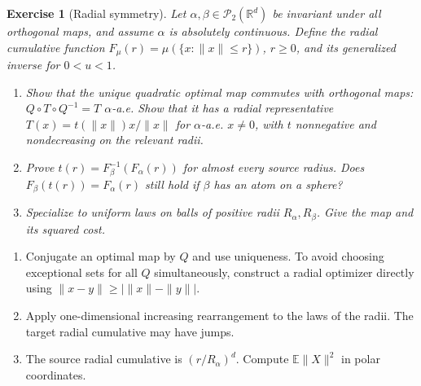 \documentclass[11pt,a4paper]{article}
\theoremstyle{exostyle}
\newtheorem{exercise}{Exercise}
\newcommand{\R}{\mathbb{R}}
\begin{document}
\begin{exercise}[Radial symmetry]\label{ex:radial}
Let $\alpha,\beta\in\mathcal P_2(\R^d)$ be invariant under all orthogonal maps, and assume $\alpha$ is absolutely continuous. Define the radial cumulative function
$F_\mu(r)=\mu(\{x:\|x\|\le r\})$, $r\ge0$, and its generalized inverse for $0<u<1$.
\begin{enumerate}[label=(\roman*)]
\item Show that the unique quadratic optimal map commutes with orthogonal maps: $Q\circ T\circ Q^{-1}=T$ $\alpha$-a.e. Show that it has a radial representative $T(x)=t(\|x\|)x/\|x\|$ for $\alpha$-a.e. $x\ne0$, with $t$ nonnegative and nondecreasing on the relevant radii.
\item Prove $t(r)=F_\beta^{-1}(F_\alpha(r))$ for almost every source radius. Does $F_\beta(t(r))=F_\alpha(r)$ still hold if $\beta$ has an atom on a sphere?
\item Specialize to uniform laws on balls of positive radii $R_\alpha,R_\beta$. Give the map and its squared cost.
\end{enumerate}
\end{exercise}
\begin{hints}
\begin{enumerate}[label=(\roman*)]
\item Conjugate an optimal map by $Q$ and use uniqueness. To avoid choosing exceptional sets for all $Q$ simultaneously, construct a radial optimizer directly using $\|x-y\|\ge|\|x\|-\|y\||$.
\item Apply one-dimensional increasing rearrangement to the laws of the radii. The target radial cumulative may have jumps.
\item The source radial cumulative is $(r/R_\alpha)^d$. Compute $\mathbb E\|X\|^2$ in polar coordinates.
\end{enumerate}
\end{hints}
\end{document}
